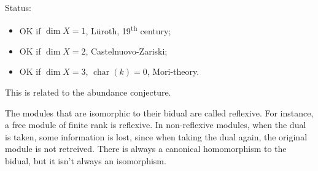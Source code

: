\documentclass[12pt]{article}
\DeclareMathOperator{\chara}{char}
\theoremstyle{definition}
\begin{document}
Status:
\begin{itemize}[label=$-$]
\item OK if $\dim X=1$, L\"uroth, 19\textsuperscript{th} century;
\item OK if $\dim X=2$, Castelnuovo-Zariski;
\item OK if $\dim X=3$, $\chara(k)=0$, Mori-theory.
\end{itemize}

This is related to the abundance conjecture.

The modules that are isomorphic to their bidual are called reflexive. For instance, a free module of finite rank is reflexive. In non-reflexive modules, when the dual is taken, some information is lost, since when taking the dual again, the original module is not retreived. There is always a canonical homomorphism to the bidual, but it isn't always an isomorphism.
\end{document}
